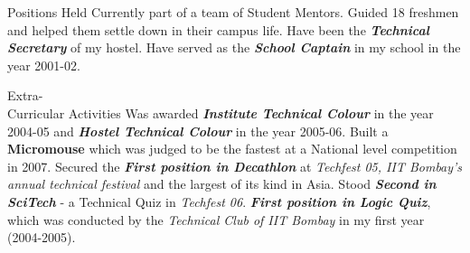 \documentclass[final]{resume}
\begin{document}


\begin{category}{Positions Held}
\citembullet Currently part of a team of Student Mentors. Guided 18 freshmen and helped them settle down in their campus life.
\citembullet Have been the \textbf{\textit{Technical Secretary}} of my hostel.
\citembullet Have served as the \textbf{\textit{School Captain}} in my school in the year 2001-02.
\end{category}
\vspace{1pt}


\begin{category}{Extra-\\Curricular Activities}
\citembullet Was awarded \textbf{\textit{Institute Technical Colour}} in the year 2004-05 and \textbf{\textit{Hostel Technical Colour}} in the year 2005-06.%
\citembullet Built a \textbf{Micromouse} which was judged to be the fastest at a National level competition in 2007. 
\citembullet Secured the \textbf{\textit{First position in Decathlon}} at \emph{Techfest 05, IIT Bombay's annual technical festival} and the largest of its kind in Asia.
\citembullet Stood \textbf{\textit{Second in SciTech}} - a Technical Quiz in \emph{Techfest 06}.
\citembullet \textbf{\textit{First position in Logic Quiz}}, which was conducted by the \emph{Technical Club of IIT Bombay} in my first year (2004-2005).
\end{category}



\end{document}
